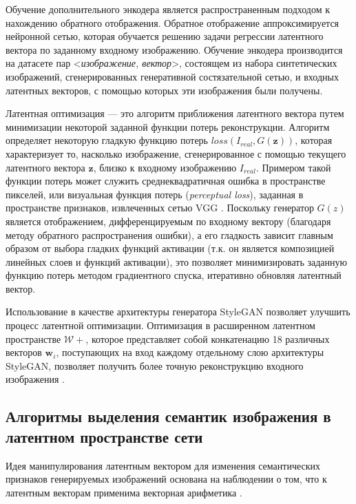 Обучение дополнительного энкодера \cite{donahue2016adversarial} является распространенным подходом к нахождению обратного отображения.
Обратное отображение аппроксимируется нейронной сетью, которая обучается решению задачи регрессии латентного вектора по заданному входному изображению. 
Обучение энкодера производится на датасете пар <\emph{изображение, вектор}>, состоящем из набора синтетических изображений, сгенерированных генеративной состязательной сетью, и входных латентных векторов, с помощью которых эти изображения были получены.

Латентная оптимизация \cite{perarnau2016invertible} --- это алгоритм приближения латентного вектора путем минимизации некоторой заданной функции потерь реконструкции.
Алгоритм определяет некоторую гладкую функцию потерь $loss(I_{real}, G(\mathbf z)) $, которая характеризует то, насколько изображение, сгенерированное с помощью текущего латентного вектора $\mathbf z$, близко к входному изображению $I_{real}$.
Примером такой функции потерь может служить среднеквадратичная ошибка в пространстве пикселей, или визуальная функция потерь (\emph{perceptual loss}), заданная в пространстве признаков, извлеченных сетью VGG \cite{Johnson2016Perceptual}.
Поскольку генератор $G(z)$ является отображением, дифференцируемым по входному вектору (благодаря методу обратного распространения ошибки), а его гладкость зависит главным образом от выбора гладких функций активации (т.к. он является композицией линейных слоев и функций активации), это позволяет минимизировать заданную функцию потерь методом градиентного спуска, итеративно обновляя латентный вектор.

Использование в качестве архитектуры генератора StyleGAN позволяет улучшить процесс латентной оптимизации.
Оптимизация в расширенном латентном пространстве $\mathcal W+$, которое представляет собой конкатенацию 18 различных векторов $\mathbf w_i$, поступающих на вход каждому отдельному слою архитектуры StyleGAN, позволяет получить более точную реконструкцию входного изображения \cite{abdal2019image2stylegan}.


\subsection{Алгоритмы выделения семантик изображения в латентном пространстве сети}

Идея манипулирования латентным вектором для изменения семантических признаков генерируемых изображений основана на наблюдении о том, что к латентным векторам применима векторная арифметика \cite{radford2015unsupervised}.

